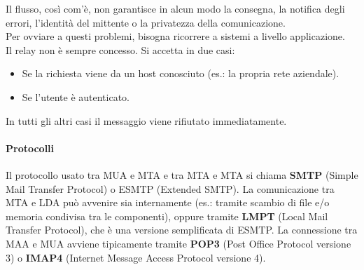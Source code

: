 \documentclass[a4paper]{report}
\begin{document}
Il flusso, così com'è, non garantisce in alcun modo la consegna, la notifica degli errori, l'identità del mittente o la privatezza della comunicazione.\\
Per ovviare a questi problemi, bisogna ricorrere a sistemi a livello applicazione.\\
Il relay non è sempre concesso. Si accetta in due casi:
\begin{itemize}
\item Se la richiesta viene da un host conosciuto (es.: la propria rete aziendale).
\item Se l'utente è autenticato.
\end{itemize}
In tutti gli altri casi il messaggio viene rifiutato immediatamente.\\
\paragraph{Protocolli} Il protocollo usato tra MUA e MTA e tra MTA e MTA si chiama \textbf{SMTP} (Simple Mail Transfer Protocol) o ESMTP (Extended SMTP). La comunicazione tra MTA e LDA può avvenire sia internamente (es.: tramite scambio di file e/o memoria condivisa tra le componenti), oppure tramite \textbf{LMPT} (Local Mail Transfer Protocol), che è una versione semplificata di ESMTP. La connessione tra MAA e MUA avviene tipicamente tramite \textbf{POP3} (Post Office Protocol versione 3) o \textbf{IMAP4} (Internet Message Access Protocol versione 4). \\
\end{document}
